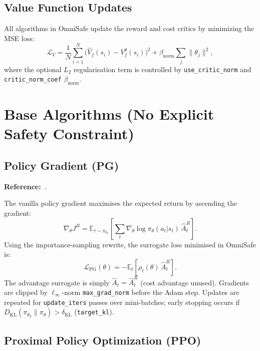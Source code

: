 \documentclass[12pt,a4paper]{article}
\theoremstyle{definition}
\newcommand{\E}{\mathbb{E}}
\newcommand{\piold}{\pi_{\theta_k}}
\newcommand{\KL}{D_{\mathrm{KL}}}
\begin{document}
\subsection{Value Function Updates}

All algorithms in OmniSafe update the reward and cost critics by minimizing the MSE loss:
\begin{equation}
  \label{eq:critic_loss}
  \mathcal{L}_V = \frac{1}{N}\sum_{i=1}^N \bigl(\hat{V}_f(s_i) - V_f^\theta(s_i)\bigr)^2 +
  \beta_{\mathrm{norm}}\sum_j \|\theta_j\|^2,
\end{equation}
where the optional $L_2$ regularisation term is controlled by \texttt{use\_critic\_norm} and
\texttt{critic\_norm\_coef} $\beta_{\mathrm{norm}}$.

\section{Base Algorithms (No Explicit Safety Constraint)}
\label{sec:base}

\subsection{Policy Gradient (PG)}
\label{sec:pg}

\textbf{Reference:}~\citet{sutton1999policy}.

The vanilla policy gradient maximises the expected return by ascending the gradient:
\begin{equation}
  \nabla_\theta J^R = \E_{\tau\sim\piold}\!\left[\sum_t \nabla_\theta\log\pi_\theta(a_t|s_t)\,\hat{A}_t^R\right].
\end{equation}
Using the importance-sampling rewrite, the surrogate loss minimised in OmniSafe is:
\begin{equation}
  \label{eq:pg_loss}
  \mathcal{L}_{\mathrm{PG}}(\theta) = -\E_t\!\left[\rho_t(\theta)\,\hat{A}_t^R\right].
\end{equation}
The advantage surrogate is simply $\hat{A}_t = \hat{A}_t^R$ (cost advantage unused). Gradients
are clipped by $\ell_\infty$-norm \texttt{max\_grad\_norm} before the Adam step. Updates are
repeated for \texttt{update\_iters} passes over mini-batches; early stopping occurs if
$\KL(\piold\|\pi_\theta) > \delta_{\mathrm{KL}}$ (\texttt{target\_kl}).

\subsection{Proximal Policy Optimization (PPO)}
\label{sec:ppo}
\end{document}
